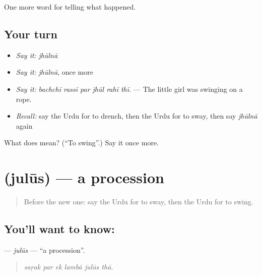 \begin{grammarlens}[title={What you've built}]
One more word for telling what happened.
\end{grammarlens}

\subsection*{Your turn}
\begin{itemize}
\raggedright
  \item \emph{Say it:} \emph{jhūlnā}
  \item \emph{Say it:} \emph{jhūlnā}, once more
  \item \emph{Say it:} \emph{bachchī rassī par jhūl rahī thī.} — The little girl was swinging on a rope.
  \item \emph{Recall:} say the Urdu for to drench, then the Urdu for to sway, then say \emph{jhūlnā} again
\end{itemize}

\begin{tcolorbox}[breakable,colback=teal!4,colframe=teal!35!black,title={Before you move on}]
What does  mean? (\textquotedblleft{}To swing\textquotedblright{}.) Say it once more.
\end{tcolorbox}
\section[\texorpdfstring{\ur{جلوس} (julūs)}{جلوس (julūs)}]{ (julūs) — a procession}

\label{lesson:UR-C321-julus}



\begin{quote}
Before the new one: say the Urdu for to sway, then the Urdu for to swing.
\end{quote}

\subsection*{You'll want to know: }
\textbf{} — \emph{julūs} — \textquotedblleft{}a procession\textquotedblright{}.

\begin{quote}
     
\end{quote}

\begin{quote}
\emph{saṛak par ek lambā julūs thā.}
\end{quote}

